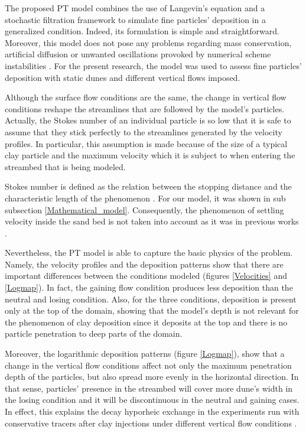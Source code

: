 \documentclass[draft,linenumbers]{agujournal2018}
\begin{document}
The proposed PT model combines the use of Langevin's equation and a stochastic filtration framework \citep{Li2017} to simulate fine particles' deposition in a generalized condition. Indeed, its formulation is simple and straightforward. Moreover, this model does not pose any problems regarding mass conservation, artificial diffusion or unwanted oscillations provoked by numerical scheme instabilities \citep{Delay2005}. For the present research, the model was used to assess fine particles' deposition with static dunes and different vertical flows imposed. 

Although the surface flow conditions are the same, the change in vertical flow conditions reshape the streamlines that are followed by the model's particles. Actually, the Stokes number of an individual particle is so low that it is safe to assume that they stick perfectly to the streamlines generated by the velocity profiles. In particular, this assumption is made because of the size of a typical clay particle and the maximum velocity which it is subject to when entering the streambed that is being modeled. 

Stokes number is defined as the relation between the stopping distance and the characteristic length of the phenomenon \citep{Clark2009}. For our model, it was shown in sub subsection \ref{Mathematical_model}. Consequently, the phenomenon of settling velocity inside the sand bed is not taken into account as it was in previous works \citep{Packman2000}.

Nevertheless, the PT model is able to capture the basic physics of the problem. Namely, the velocity profiles and the deposition patterns show that there are important differences between the conditions modeled (figures \ref{Velocities} and \ref{Logmap}). In fact, the gaining flow condition produces less deposition than the neutral and losing condition. Also, for the three conditions, deposition is present only at the top of the domain, showing that the model's depth is not relevant for the phenomenon of clay deposition since it deposits at the top and there is no particle penetration to deep parts of the domain. 

Moreover, the logarithmic deposition patterns (figure \ref{Logmap}), show that a change in the vertical flow conditions affect not only the maximum penetration depth of the particles, but also spread more evenly in the horizontal direction. In that sense, particles' presence in the streambed will cover more dune's width in the losing condition and it will be discontinuous in the neutral and gaining cases. In effect, this explains the decay hyporheic exchange in the experiments run with conservative tracers after clay injections under different vertical flow conditions \citep{Fox2014,Fox2018}.
\end{document}
